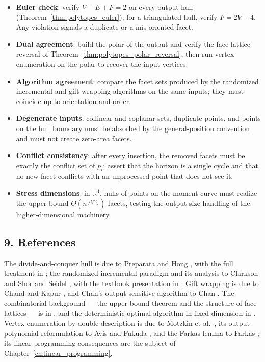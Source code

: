 \begin{itemize}
\item \textbf{Euler check}: verify $V - E + F = 2$ on every output hull
  (Theorem~\ref{thm:polytopes_euler}); for a triangulated hull, verify
  $F = 2V - 4$. Any violation signals a duplicate or a mis-oriented facet.
\item \textbf{Dual agreement}: build the polar of the output and verify the
  face-lattice reversal of Theorem~\ref{thm:polytopes_polar_reversal}, then
  run vertex enumeration on the polar to recover the input vertices.
\item \textbf{Algorithm agreement}: compare the facet sets produced by the
  randomized incremental and gift-wrapping algorithms on the same inputs;
  they must coincide up to orientation and order.
\item \textbf{Degenerate inputs}: collinear and coplanar sets, duplicate
  points, and points on the hull boundary must be absorbed by the
  general-position convention and must not create zero-area facets.
\item \textbf{Conflict consistency}: after every insertion, the removed
  facets must be exactly the conflict set of $p_i$; assert that the horizon
  is a single cycle and that no new facet conflicts with an unprocessed
  point that does not see it.
\item \textbf{Stress dimensions}: in $\mathbb{R}^4$, hulls of points on the
  moment curve must realize the upper bound
  $\Theta(n^{\lfloor d/2 \rfloor})$ facets, testing the output-size handling
  of the higher-dimensional machinery.
\end{itemize}

\subsection{9. References}

The divide-and-conquer hull is due to Preparata and Hong
\cite{preparata1977}, with the full treatment in \cite{preparata1985}; the
randomized incremental paradigm and its analysis to Clarkson and Shor
\cite{clarkson1989} and Seidel \cite{seidel1991}, with the textbook
presentation in \cite{deberg2008}. Gift wrapping is due to Chand and Kapur
\cite{chand1970}, and Chan's output-sensitive algorithm to Chan
\cite{chan1996}. The combinatorial background --- the upper bound theorem
and the structure of face lattices --- is in \cite{edelsbrunner1987,
matousek1999}, and the deterministic optimal algorithm in fixed dimension in
\cite{chazelle1993}. Vertex enumeration by double description is due to
Motzkin et al.\ \cite{motzkin1953}, its output-polynomial reformulation to
Avis and Fukuda \cite{avis1992}, and the Farkas lemma to Farkas
\cite{farkas1902}; its linear-programming consequences are the subject of
Chapter~\ref{ch:linear_programming}.

